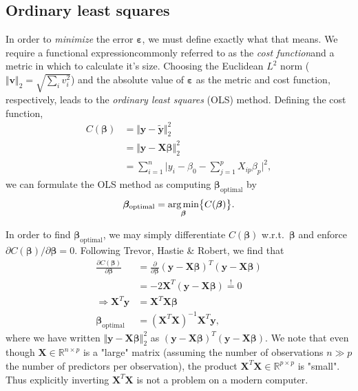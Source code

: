 \documentclass[a4paper]{article}
\begin{document}
\begin{multicols}{2}
\subsection{Ordinary least squares \label{sect:OLS}}
In order to \textit{minimize} the error $\bm\varepsilon$, we must define exactly what that means. We require a functional expression\textemdash commonly referred to as the \textit{cost function}\textemdash and a metric in which to calculate it's size. Choosing the Euclidean $L^2$ norm ($\Vert \mathbf{v} \Vert_2=\sqrt{\sum_i v_i^2}$) and the absolute value of $\bm\varepsilon$ as the metric and cost function, respectively, leads to the \textit{ordinary least squares} (OLS) method. Defining the cost function, 
\begin{align}
C(\bm\beta) &= \Vert \mathbf{y} - \tilde{\mathbf{y}}\Vert_2^2 \nonumber \\
%
&= \Vert \mathbf{y} - \mathbf{X}\bm\beta\Vert_2^2 \nonumber \\ 
&= \sum_{i=1}^n \Big| y_i - \beta_0 - \sum_{j=1}^p X_{ip} \beta_p \Big|^2, \label{eq:cost}
\end{align}
we can formulate the OLS method as computing $\bm\beta_\text{optimal}$ by
\begin{align}
\bm\beta_\text{optimal}=\underset{\bm\beta}{\text{arg\,min}}\big\{C(\bm\beta)\big\}.
\end{align}

In order to find $\bm\beta_\text{optimal}$, we may simply differentiate $C(\bm\beta)$ w.r.t.\ $\bm\beta$ and enforce $\partial C(\bm\beta)/\partial \bm\beta = 0$. Following Trevor, Hastie \& Robert\autocite{trevor2009elements}, we find that
\begin{align}
\frac{\partial C(\bm\beta)}{\partial \bm\beta} &= \frac{\partial}{\partial \bm\beta} (\mathbf{y}-\mathbf{X}\bm\beta)^T (\mathbf{y}-\mathbf{X}\bm\beta) \nonumber \\
%
&= -2\mathbf{X}^T(\mathbf{y}-\mathbf{X}\bm\beta) \stackrel{!}{=} 0 \nonumber \\
%
\Rightarrow \mathbf{X}^T\mathbf{y} &= \mathbf{X}^T\mathbf{X}\bm\beta \nonumber \\
%
\bm\beta_\text{optimal} &= \left(\mathbf{X}^T\mathbf{X}\right)^{-1}\mathbf{X}^T\mathbf{y},
\end{align}
where we have written $\Vert \mathbf{y}-\mathbf{X}\bm\beta\Vert_2^2$ as $(\mathbf{y}-\mathbf{X}\bm\beta)^T (\mathbf{y}-\mathbf{X}\bm\beta)$. We note that even though $\mathbf{X}\in \mathbb{R}^{n\times p}$ is a "large" matrix (assuming the number of observations $n\gg p$ the number of predictors per observation), the product $\mathbf{X}^T\mathbf{X}\in \mathbb{R}^{p\times p}$ is "small". Thus explicitly inverting $\mathbf{X}^T\mathbf{X}$ is not a problem on a modern computer. 


\end{multicols}
\end{document}
